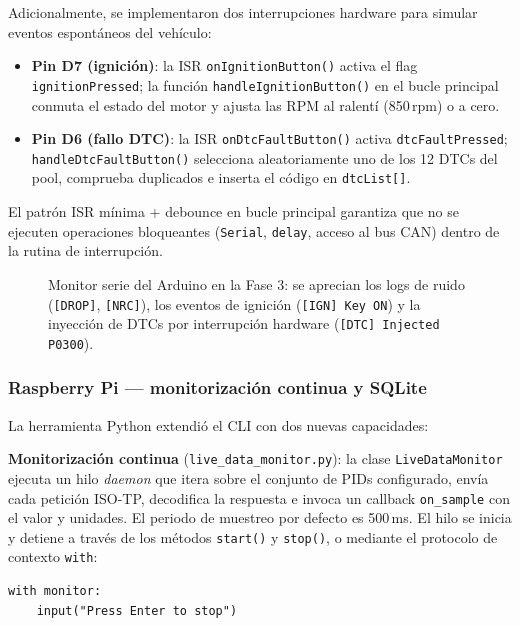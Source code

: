 Adicionalmente, se implementaron dos interrupciones hardware para simular eventos espontáneos del vehículo:

\begin{itemize}
    \item \textbf{Pin D7 (ignición)}: la ISR \texttt{onIgnitionButton()} activa el flag \texttt{ignitionPressed}; la función \texttt{handleIgnitionButton()} en el bucle principal conmuta el estado del motor y ajusta las RPM al ralentí (850\,rpm) o a cero.
    \item \textbf{Pin D6 (fallo DTC)}: la ISR \texttt{onDtcFaultButton()} activa \texttt{dtcFaultPressed}; \texttt{handleDtcFaultButton()} selecciona aleatoriamente uno de los 12 DTCs del pool, comprueba duplicados e inserta el código en \texttt{dtcList[]}.
\end{itemize}

El patrón ISR mínima + debounce en bucle principal garantiza que no se ejecuten operaciones bloqueantes (\texttt{Serial}, \texttt{delay}, acceso al bus CAN) dentro de la rutina de interrupción.

\begin{figure}[!htbp]
\centering
\caption{Monitor serie del Arduino en la Fase 3: se aprecian los logs de ruido (\texttt{[DROP]}, \texttt{[NRC]}), los eventos de ignición (\texttt{[IGN] Key ON}) y la inyección de DTCs por interrupción hardware (\texttt{[DTC] Injected P0300}).}
\label{fig:fase3_arduino_noise}
\end{figure}

\subsubsection*{Raspberry Pi — monitorización continua y SQLite}

La herramienta Python extendió el CLI con dos nuevas capacidades:

\textbf{Monitorización continua} (\texttt{live\_data\_monitor.py}): la clase \texttt{LiveDataMonitor} ejecuta un hilo \textit{daemon} que itera sobre el conjunto de PIDs configurado, envía cada petición ISO-TP, decodifica la respuesta e invoca un callback \texttt{on\_sample} con el valor y unidades. El periodo de muestreo por defecto es 500\,ms. El hilo se inicia y detiene a través de los métodos \texttt{start()} y \texttt{stop()}, o mediante el protocolo de contexto \texttt{with}:

\begin{verbatim}
with monitor:
    input("Press Enter to stop")
\end{verbatim}

